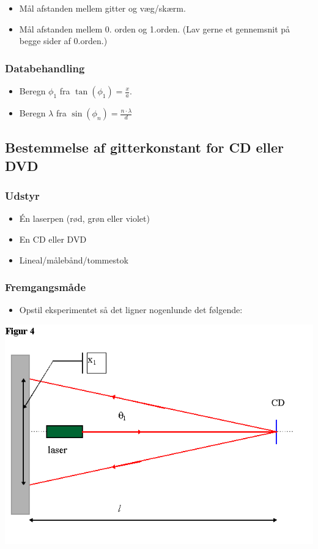 \documentclass[a4paper, 12pt]{article}
\begin{document}
\begin{itemize}
\item Mål afstanden mellem gitter og væg/skærm.
\item Mål afstanden mellem 0. orden og 1.orden. (Lav gerne et gennemsnit på begge sider af 0.orden.)
\end{itemize}

\subsubsection*{Databehandling}
\label{sec:org0622c0d}
\begin{itemize}
\item Beregn \(\phi_1\) fra \(\tan \left( \phi_1 \right) = \frac{x}{a}\).
\item Beregn \(\lambda\) fra \(\sin \left( \phi_{n} \right) = \frac{n \cdot \lambda}{d}\)
\end{itemize}

\newpage
\subsection*{Bestemmelse af gitterkonstant for CD eller DVD}
\label{sec:orga55ebc5}
\subsubsection*{Udstyr}
\label{sec:org0927eaf}
\begin{itemize}
\item Én laserpen (rød, grøn eller violet)
\item En CD eller DVD
\item Lineal/målebånd/tommestok
\end{itemize}
\subsubsection*{Fremgangsmåde}
\label{sec:orgd4e1459}
\begin{itemize}
\item Opstil eksperimentet så det ligner nogenlunde det følgende:
\end{itemize}

\begin{center}
\includegraphics[width=.9\linewidth]{./img/gitterkonstant_cd_dvd.png}
\end{center}
\end{document}
